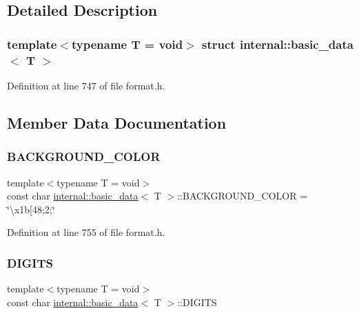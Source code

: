 \subsection{Detailed Description}
\subsubsection*{template$<$typename T = void$>$\newline
struct internal\+::basic\+\_\+data$<$ T $>$}



Definition at line 747 of file format.\+h.



\subsection{Member Data Documentation}
\mbox{\label{structinternal_1_1basic__data_a67b9e51c3f0e76efca886f498779bbe9}} 
\subsubsection{\texorpdfstring{B\+A\+C\+K\+G\+R\+O\+U\+N\+D\+\_\+\+C\+O\+L\+OR}{BACKGROUND\_COLOR}}
{\footnotesize\ttfamily template$<$typename T  = void$>$ \\
const char \hyperlink{structinternal_1_1basic__data}{internal\+::basic\+\_\+data}$<$ T $>$\+::B\+A\+C\+K\+G\+R\+O\+U\+N\+D\+\_\+\+C\+O\+L\+OR = \char`\"{}\textbackslash{}x1b\mbox{[}48;2;\char`\"{}\hspace{0.3cm}{\ttfamily [static]}}



Definition at line 755 of file format.\+h.

\mbox{\label{structinternal_1_1basic__data_a4499b69babdd8e4b4badeed17030ddc8}} 
\subsubsection{\texorpdfstring{D\+I\+G\+I\+TS}{DIGITS}}
{\footnotesize\ttfamily template$<$typename T  = void$>$ \\
const char \hyperlink{structinternal_1_1basic__data}{internal\+::basic\+\_\+data}$<$ T $>$\+::D\+I\+G\+I\+TS\hspace{0.3cm}{\ttfamily [static]}}


